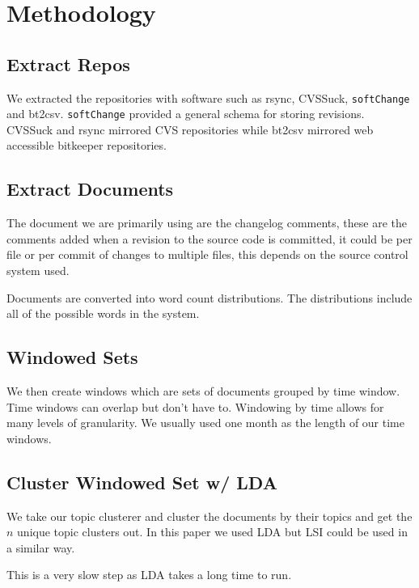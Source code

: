 \documentclass[times, 10pt,twocolumn]{article}
\begin{document}
\section{Methodology}

\subsection{Extract Repos}

We extracted the repositories with software such as rsync, CVSSuck,
\texttt{softChange} and bt2csv.  \texttt{softChange} provided a
general schema for storing revisions. CVSSuck and rsync mirrored CVS
repositories while bt2csv mirrored web accessible bitkeeper
repositories.


\subsection{Extract Documents}

The document we are primarily using are the changelog comments, these
are the comments added when a revision to the source code is
committed, it could be per file or per commit of changes to multiple
files, this depends on the source control system used.

Documents are converted into word count distributions. The
distributions include all of the possible words in the system.

\subsection{Windowed Sets}

We then create windows which are sets of documents grouped by time
window. Time windows can overlap but don't have to. Windowing by time
allows for many levels of granularity. We usually used one month as
the length of our time windows.

\subsection{Cluster Windowed Set w/ LDA}

We take our topic clusterer and cluster the documents by their topics
and get the $n$ unique topic clusters out. In this paper we used LDA
but LSI could be used in a similar way.

This is a very slow step as LDA takes a long time to run.
\end{document}
